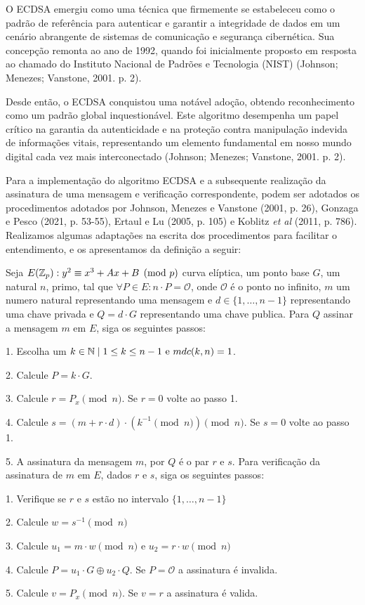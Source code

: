 O ECDSA emergiu como uma técnica que firmemente se estabeleceu como o padrão de
referência para autenticar e garantir a integridade de dados em um cenário
abrangente de sistemas de comunicação e segurança cibernética. Sua concepção
remonta ao ano de 1992, quando foi inicialmente proposto em resposta ao chamado
do Instituto Nacional de Padrões e Tecnologia (NIST) (Johnson; Menezes;
Vanstone, 2001. p. 2).

Desde então, o ECDSA conquistou uma notável adoção, obtendo reconhecimento como
um padrão global inquestionável. Este algoritmo desempenha um papel crítico na
garantia da autenticidade e na proteção contra manipulação indevida de
informações vitais, representando um elemento fundamental em nosso mundo
digital cada vez mais interconectado (Johnson; Menezes; Vanstone, 2001. p. 2).

Para a implementação do algoritmo ECDSA e a subsequente realização da
assinatura de uma mensagem e verificação correspondente, podem ser adotados os
procedimentos adotados por Johnson, Menezes e Vanstone (2001, p. 26), Gonzaga e
Pesco (2021, p. 53-55), Ertaul e Lu (2005, p. 105) e Koblitz \textit{et al}
(2011, p. 786). Realizamos algumas adaptações na escrita dos procedimentos para
facilitar o entendimento, e os apresentamos da definição a seguir:

\begin{definicao} \label{definicao:68f23b4d-0cae-44d3-8489-a171e2297efa}

	Seja $E(\mathbb{Z}_{p}): y^2 \equiv x^3 + Ax + B \pmod{p}$ curva elíptica, um ponto
	base $G$, um natural $n$, primo, tal que $\forall P \in E: n \cdot P =
		\mathcal{O}$, onde $\mathcal{O}$ é o ponto no infinito, $m$ um numero natural
	representando uma mensagem e $d \in \{1, \ldots, n - 1\}$ representando uma
	chave privada e $Q = d \cdot G$ representando uma chave publica. \justify Para
	$Q$ assinar a mensagem $m$ em $E$, siga os seguintes passos:

	1. Escolha um $k \in \mathbb{N} \mid 1 \leq k \leq n - 1 \text{ e } mdc(k, n) = 1$.

	2. Calcule $P = k \cdot  G$.

	3. Calcule $r = P_x \pmod{n}$. Se $r = 0$ volte ao passo 1.

	4. Calcule $s = (m + r \cdot d) \cdot (k^{-1} \pmod{n}) \pmod{n}$. Se $s = 0$ volte ao passo 1.

	5. A assinatura da mensagem $m$, por $Q$ é o par $r$ e $s$.
	\justify
	Para verificação da assinatura de $m$ em $E$, dados $r$ e $s$, siga os seguintes passos:

	1. Verifique se $r$ e $s$ estão no intervalo $\{1, \ldots, n - 1\}$

	2. Calcule $w = s^{-1} \pmod{n}$

	3. Calcule $u_1 = m \cdot w \pmod{n}$ e $u_2 = r \cdot w \pmod{n}$

	4. Calcule $P = u_1 \cdot G \oplus u_2 \cdot Q$. Se $P = \mathcal{O}$ a assinatura é invalida.

	5. Calcule $v = P_x \pmod{n}$. Se $v = r$ a assinatura é valida.
\end{definicao}

